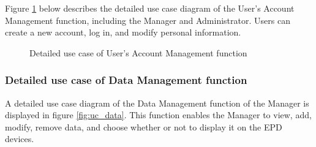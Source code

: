 \documentclass[../Main.tex]{subfiles}
\begin{document}
Figure \ref{fig:uc_user} below describes the detailed use case diagram of the User's Account Management function, including the Manager and Administrator. Users can create a new account, log in, and modify personal information.

\begin{figure}[H]
    \centering
    \caption{Detailed use case of User's Account Management function}
    \label{fig:uc_user}
\end{figure}

\subsubsection{Detailed use case of Data Management function}
A detailed use case diagram of the Data Management function of the Manager is displayed in figure \ref{fig:uc_data}. This function enables the Manager to view, add, modify, remove data, and choose whether or not to display it on the EPD devices.
\end{document}
